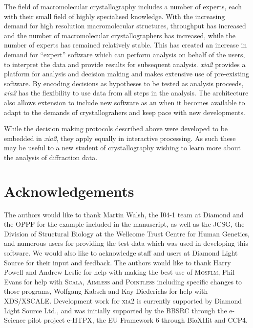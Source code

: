 \documentclass[preprint,pdf]{iucr}
\begin{document}
The field of macromolecular crystallography includes a number of
experts, each with their small field of highly specialised
knowledge. With the increasing demand for high resolution
macromolecular structures, throughput has increased and the number of
macromolecular crystallographers has increased, while the number of
experts has remained relatively stable. This has created an increase
in demand for ``expert'' software which can perform analysis on behalf
of the users, to interpret the data and provide results for subsequent
analysis. \emph{xia2} provides a platform for analysis and decision
making and makes extensive use of pre-existing software. By encoding
decisions as hypotheses to be tested as analysis proceeds, \emph{xia2}
has the flexibility to use data from all steps in the analysis. The
architecture also allows extension to include new software as an when
it becomes available to adapt to the demands of crystallograhers and
keep pace with new developments.

While the decision making protocols described above were developed to
be embedded in \emph{xia2}, they apply equally in interactive
processing. As such these may be useful to a new student of
crystallography wishing to learn more about the analysis of
diffraction data.

\section{Acknowledgements}

The authors would like to thank Martin Walsh, the I04-1 team at
Diamond  and the OPPF for the
example included in the manuscript, as well as
the JCSG, the Division of Structural Biology at
the Wellcome Trust Centre for Human Genetics,
and numerous users for providing the test data which was used in 
developing this software. We would also like to acknowledge staff and users 
at Diamond Light Source for their input and feedback.
The authors would like to thank Harry Powell
and Andrew Leslie for help with making the best use of \textsc{Mosflm},
Phil Evans for help with \textsc{Scala}, \textsc{Aimless} and
\textsc{Pointless} including  
specific changes to those programs, Wolfgang Kabsch and Kay Diederichs
for help with XDS/XSCALE. 
Development work for \textsc{xia2} is currently supported by Diamond
Light Source Ltd., and was initially supported by the BBSRC
through the e-Science pilot project e-HTPX, the EU Framework 6 through 
BioXHit and CCP4.

{}
%

\end{document}
